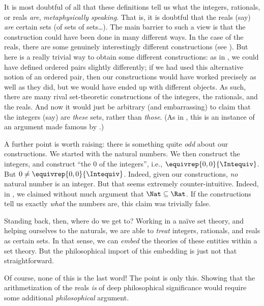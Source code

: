 \documentclass[../../../include/open-logic-section]{subfiles}
\begin{document}
It is most doubtful of all that these definitions tell us what the
integers, rationals, or reals \emph{are}, \emph{metaphysically
speaking}. That is, it is doubtful that the reals (say) \emph{are}
certain sets (of sets of sets\ldots). The main barrier to such a view
is that the construction could have been done in many different ways.
In the case of the reals, there are some genuinely interestingly
different constructions (see ). But here is a
really trivial way to obtain some different constructions: as in
, we could have defined ordered pairs
slightly differently; if we had used this alternative notion of an
ordered pair, then our constructions would have worked precisely as
well as they did, but we would have ended up with different objects.
As such, there are many rival set-theoretic constructions of the
integers, the rationals, and the reals. And now it would just be
arbitrary (and embarrassing) to claim that the integers (say) are
\emph{these} sets, rather than \emph{those}. (As in
, this is an instance of an argument made
famous by \cite{Benacerraf1965}.)

A further point is worth raising: there is something quite \emph{odd}
about our constructions. We started with the natural numbers. We then
construct the integers, and construct ``the $0$ of the integers'',
i.e., $ \equivrep{0,0}{\Intequiv}$. But $0 \neq
\equivrep{0,0}{\Intequiv}$. Indeed,  given our constructions,
\emph{no} natural number is an integer. But that seems extremely
counter-intuitive. Indeed, in , we claimed
without much argument that $\Nat \subseteq \Rat$. If the constructions
tell us exactly \emph{what} the numbers are, this claim was trivially
false. 

Standing back, then, where do we get to? Working in a na\"ive set
theory, and helping ourselves to the naturals, we are able to
\emph{treat} integers, rationals, and reals as certain sets. In that
sense, we can \emph{embed} the theories of these entities within a set
theory. But the philosophical import of this embedding is just not
that straightforward. 

Of course, none of this is the last word!{} The point is only this.
Showing that the arithmetization of the reals \emph{is} of deep
philosophical significance would require some additional
\emph{philosophical} argument.

\end{document}
